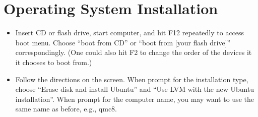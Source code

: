 \documentclass[12pt]{article}
\begin{document}
\section{Operating System Installation}
\begin{itemize}
\item Insert CD or flash drive, start computer, and hit F12 repeatedly to access boot menu.
Choose ``boot from CD'' or ``boot from [your flash drive]'' correspondingly.
(One could also hit F2 to change the order of the devices it it chooses to boot from.)
\item Follow the directions on the screen.
When prompt for the installation type, choose ``Erase disk and install Ubuntu'' and ``Use LVM with the new Ubuntu installation''.
When prompt for the computer name, you may want to use the same name as before, e.g., qmc8.
\end{itemize}
\end{document}
